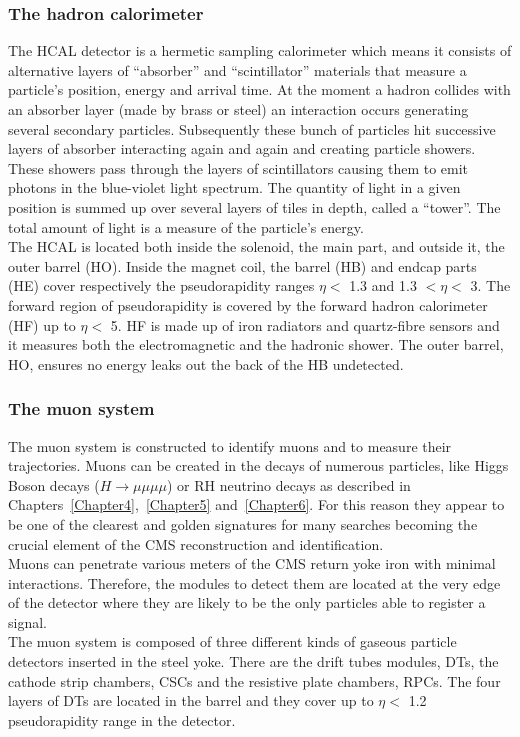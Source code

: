 \subsubsection{The hadron calorimeter}
The HCAL detector is a hermetic sampling calorimeter which means it
consists of alternative layers of ``absorber'' and ``scintillator''
materials that measure a particle’s position, energy and arrival time.
At the moment a hadron collides with an absorber layer (made by brass or steel) an interaction occurs generating several secondary
particles. Subsequently these bunch of particles hit successive layers
of absorber interacting again and again and creating particle showers.
These showers pass through the layers of scintillators
causing them to emit photons in the blue-violet light spectrum.
The quantity of light in a given position is summed up over several
layers of tiles in depth, called a “tower”. The total amount of
light is a measure of the particle’s energy.\\
The HCAL is located both inside the solenoid, the main part, and
outside it, the outer barrel (HO). 
Inside the magnet coil, the barrel (HB) and endcap parts (HE) cover
respectively the pseudorapidity
ranges $\eta<$ 1.3 and 1.3 $<\eta<$ 3.
The forward region of pseudorapidity is covered by the forward hadron
calorimeter (HF) up to $\eta<$ 5. HF is made up of iron radiators and
quartz-fibre sensors and it measures both the electromagnetic and the hadronic shower. 
The outer barrel, HO, ensures no energy leaks out the
back of the HB undetected.

\subsubsection{The muon system}\label{sec:muonsystem}
The muon system is constructed to identify muons and to measure their
trajectories. Muons can be created in the decays of numerous particles,
like Higgs Boson decays ($H \rightarrow \mu \mu \mu \mu$) or 
RH neutrino decays as described in
Chapters~\ref{Chapter4},~\ref{Chapter5} and~\ref{Chapter6}. For this
reason they
appear to be one of the clearest and golden signatures for many
searches becoming the crucial element of the CMS reconstruction
and identification.\\
Muons can penetrate various meters of the CMS return yoke iron with
minimal interactions. Therefore, the modules to detect them are located at
the very edge of the detector where they are likely to be the only particles
able to register a signal.\\
The muon system is composed of three different kinds of gaseous particle
detectors inserted in the steel yoke. 
There are the drift tubes
modules, DTs, the cathode strip chambers, CSCs and the resistive plate
chambers, RPCs.
The four layers of DTs are located in the barrel and they cover up to
$\eta<$ 1.2 pseudorapidity range in the detector. 


